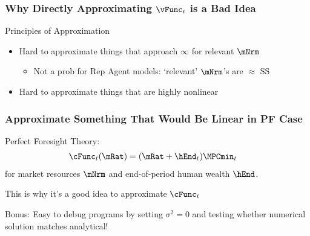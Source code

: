 \documentclass{beamer}
\begin{document}
\begin{frame}
\frametitle{Why Directly Approximating $\vFunc_{t}$ is a Bad Idea}

Principles of Approximation

\begin{itemize}
\item Hard to approximate things that approach $\infty$ for relevant $\mNrm$
\begin{itemize}
\item Not a prob for Rep Agent models: `relevant' $\mNrm$'s are $\approx$ SS
\end{itemize}
\item Hard to approximate things that are highly nonlinear 
\end{itemize}


\end{frame}


\begin{frame}
\frametitle{Approximate Something That Would Be Linear in PF Case}

\medskip

Perfect Foresight Theory:
\begin{equation}\begin{gathered}\begin{aligned}
  \cFunc_{t}(\mRat)  & = (\mRat+\hEnd_{t})\MPCmin_{t} 
\end{aligned}\end{gathered}\end{equation}
for market resources $\mNrm$ and end-of-period human wealth $\hEnd$.


\medskip\medskip
\pause 

This is why it's a good idea to approximate $\cFunc_{t}$ 

\pause \medskip\medskip

Bonus: Easy to debug programs by setting $\sigma^{2} = 0$ and
testing whether numerical solution matches analytical!

\end{frame}
\end{document}
